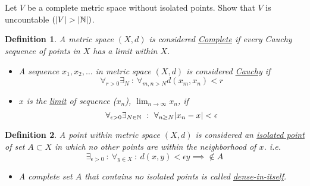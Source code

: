 \documentclass[]{article}
\newcommand{\N}{\mathbb{N}}
\newcommand{\st}{\ : \ }
\newtheorem{definition}{Definition}
\begin{document}
\newpage
\section{}
Let $V$ be a complete metric space without isolated points.
Show that $V$ is uncountable $(\abs{V} > \abs{\N})$.

\begin{definition}\label{def:complete_cauchy_limit}
    A metric space $(X,d)$ is considered \emph{\underline{Complete}} 
    if every Cauchy sequence of points in $X$ has a limit within $X$.
    \begin{itemize}
        \item A sequence $x_1, x_2, \dots$ in metric space $(X,d)$ 
        is considered \emph{\underline{Cauchy}} if
        \[
            \forall_{r > 0} \exists_N \st \forall_{m,n > N} d(x_m,x_n) < r
        \]
        \item $x$ is the \underline{\emph{limit}} of sequence ($x_n$), 
        $\lim_{n \to \infty} x_n$, if
        \[
            \forall_{\epsilon>0} \exists_{N \in \N} \st \forall_{n\geq N} \abs{x_n - x} < \epsilon
        \]
    \end{itemize}
\end{definition}

\begin{definition}\label{def:isolated_points}
    A point within metric space $(X,d)$ is considered an 
    \emph{\underline{isolated point}} of set $A \subset X$ 
    in which no other points are within the neighborhood of $x$.
    i.e.\[
        \exists_{\epsilon>0} \st \forall_{y \in X} 
            \st d(x,y) < \epsilon y \implies \not \in A
    \]
    \begin{itemize}
        \item A complete set $A$ that contains no isolated points is called 
            \emph{\underline{dense-in-itself}}.
    \end{itemize}
\end{definition}
\end{document}
